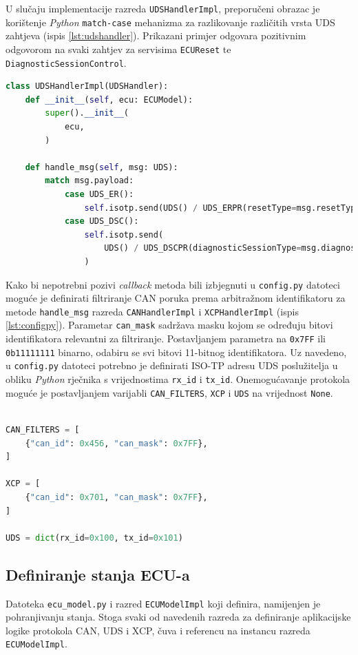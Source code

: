 \documentclass[times, utf8, diplomski, numeric]{fer}
\begin{document}
U slučaju implementacije razreda \texttt{UDSHandlerImpl}, preporučeni obrazac je korištenje \textit{Python} \texttt{match-case} mehanizma za razlikovanje različitih vrsta UDS zahtjeva (ispis \ref{lst:udshandler}). Prikazani primjer odgovara pozitivnim odgovorom na svaki zahtjev za servisima \texttt{ECUReset} te \texttt{DiagnosticSessionControl}.
\bigskip
\begin{lstlisting}[language=Python, label={lst:udshandler},caption={\texttt{UDSHandlerImpl} primjer}]
class UDSHandlerImpl(UDSHandler):
    def __init__(self, ecu: ECUModel):
        super().__init__(
            ecu,
        )

    def handle_msg(self, msg: UDS):
        match msg.payload:
            case UDS_ER():
                self.isotp.send(UDS() / UDS_ERPR(resetType=msg.resetType))
            case UDS_DSC():
                self.isotp.send(
                    UDS() / UDS_DSCPR(diagnosticSessionType=msg.diagnosticSessionType)
                )
\end{lstlisting}
Kako bi nepotrebni pozivi \textit{callback} metoda bili izbjegnuti u \texttt{config.py} datoteci moguće je definirati filtriranje CAN poruka prema arbitražnom identifikatoru za metode \texttt{handle\_msg} razreda \texttt{CANHandlerImpl} i \texttt{XCPHandlerImpl} (ispis \ref{lst:configpy}). Parametar \texttt{can\_mask} sadržava masku kojom se određuju bitovi identifikatora relevantni za filtriranje. Postavljanjem parametra na \texttt{0x7FF} ili \texttt{0b11111111} binarno, odabiru se svi bitovi 11-bitnog identifikatora. Uz navedeno, u \texttt{config.py} datoteci potrebno je definirati ISO-TP adresu UDS poslužitelja u obliku \textit{Python} rječnika s vrijednostima \texttt{rx\_id} i \texttt{tx\_id}. Onemogućavanje protokola moguće je postavljanjem varijabli \texttt{CAN\_FILTERS}, \texttt{XCP} i \texttt{UDS} na vrijednost \texttt{None}. 
\bigskip
\begin{lstlisting}[language=Python, label={lst:configpy},caption={\texttt{Konfiguracija filtriranja i ISO-TP adrese} primjer}]

CAN_FILTERS = [
    {"can_id": 0x456, "can_mask": 0x7FF},
]

XCP = [
    {"can_id": 0x701, "can_mask": 0x7FF},
]

UDS = dict(rx_id=0x100, tx_id=0x101)
\end{lstlisting}

\subsection{Definiranje stanja ECU-a}
Datoteka \texttt{ecu\_model.py} i razred \texttt{ECUModelImpl} koji definira, namijenjen je pohranjivanju stanja. Stoga svaki od navedenih razreda za definiranje aplikacijske logike protokola CAN, UDS i XCP, čuva i referencu na instancu razreda \texttt{ECUModelImpl}.
\end{document}
